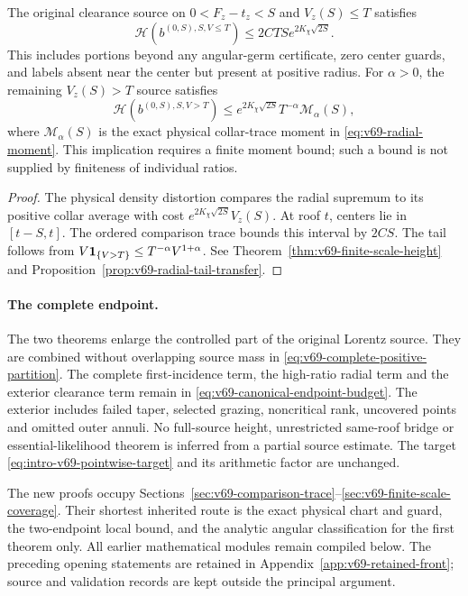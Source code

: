 \begin{leadtheorem}
\label{thm:intro-v69-full-radius}
The original clearance source on $0<F_z-t_z<S$ and $V_z(S)\le T$
satisfies
\[
 \mathcal H(b^{(0,S),S,V\le T})
             \le2CTS e^{2K_\chi\sqrt{2S}}.
\]
This includes portions beyond any angular-germ certificate, zero
center guards, and labels absent near the center but present at
positive radius. For $\alpha>0$, the remaining $V_z(S)>T$ source
satisfies
\[
 \mathcal H(b^{(0,S),S,V>T})
 \le e^{2K_\chi\sqrt{2S}}T^{-\alpha}\mathcal M_\alpha(S),
\]
where $\mathcal M_\alpha(S)$ is the exact physical collar-trace
moment in \eqref{eq:v69-radial-moment}. This implication requires a
finite moment bound; such a bound is not supplied by finiteness of
individual ratios.
\end{leadtheorem}
\begin{proof}
The physical density distortion compares the radial supremum to its
positive collar average with cost $e^{2K_\chi\sqrt{2S}}V_z(S)$.
At roof $t$, centers lie in $[t-S,t]$. The ordered comparison trace
bounds this interval by $2CS$. The tail follows from
$V\mathbf1_{\{V>T\}}\le T^{-\alpha}V^{1+\alpha}$.
See Theorem~\ref{thm:v69-finite-scale-height} and
Proposition~\ref{prop:v69-radial-tail-transfer}.
\end{proof}

\paragraph{The complete endpoint.}
The two theorems enlarge the controlled part of the original Lorentz
source. They are combined without overlapping source mass in
\eqref{eq:v69-complete-positive-partition}. The complete
first-incidence term, the high-ratio radial term and the exterior
clearance term remain in
\eqref{eq:v69-canonical-endpoint-budget}. The exterior includes
failed taper, selected grazing, noncritical rank, uncovered points
and omitted outer annuli. No full-source height, unrestricted
same-roof bridge or essential-likelihood theorem is inferred from a
partial source estimate. The target \eqref{eq:intro-v69-pointwise-target}
and its arithmetic factor are unchanged.

The new proofs occupy
Sections~\ref{sec:v69-comparison-trace}--\ref{sec:v69-finite-scale-coverage}.
Their shortest inherited route is the exact physical chart and guard,
the two-endpoint local bound, and the analytic angular classification
for the first theorem only. All earlier mathematical modules remain
compiled below. The preceding opening statements are retained in
Appendix~\ref{app:v69-retained-front}; source and validation records
are kept outside the principal argument.


